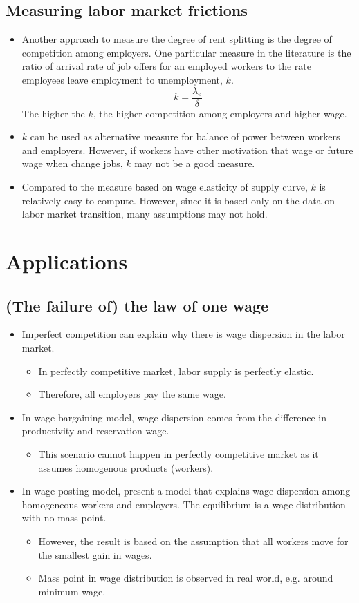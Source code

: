 \documentclass[a4paper, 12pt]{article}
\begin{document}
\subsection{Measuring labor market frictions}
\begin{itemize}
\item Another approach to measure the degree of rent splitting is the degree of competition among employers. One particular measure in the literature is the ratio of arrival rate of job offers for an employed workers to the rate employees leave employment to unemployment, $k$.
$$
k=
\frac{\lambda_e}{\delta}
$$
The higher the $k$, the higher competition among employers and higher wage.
\item $k$ can be used as alternative measure for balance of power between workers and employers. However, if workers have other motivation that wage or future wage when change jobs, $k$ may not be a good measure.
\item Compared to the measure based on wage elasticity of supply curve, $k$ is relatively easy to compute. However, since it is based only on the data on labor market transition, many assumptions may not hold.
\end{itemize}
\section{Applications}
\subsection{(The failure of) the law of one wage}
\begin{itemize}
\item Imperfect competition can explain why there is wage dispersion in the labor market.
\begin{itemize}
\item In perfectly competitive market, labor supply is perfectly elastic.
\item Therefore, all employers pay the same wage.
\end{itemize}
\item In wage-bargaining model, wage dispersion comes from the difference in productivity and reservation wage.
\begin{itemize}
\item This scenario cannot happen in perfectly competitive market as it assumes homogenous products (workers).
\end{itemize}
\item In wage-posting model, \cite{burdett1998wage} present a model that explains wage dispersion among homogeneous workers and employers. The equilibrium is a wage distribution with no mass point.
\begin{itemize}
\item However, the result is based on the assumption that all workers move for the smallest gain in wages.
\item Mass point in wage distribution is observed in real world, e.g. around minimum wage. 
\end{itemize}
\end{itemize}
\end{document}
